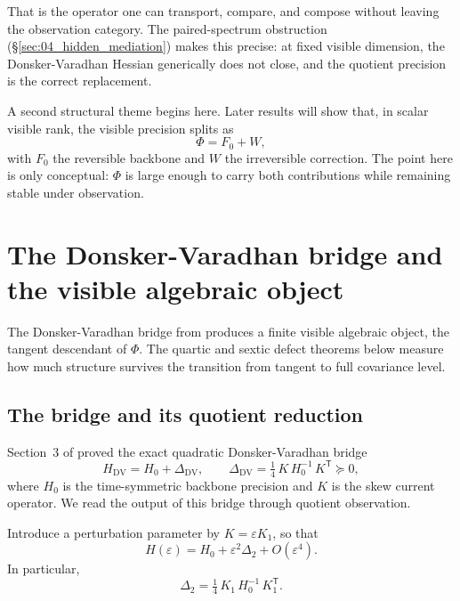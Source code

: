 \documentclass[11pt]{article}
\numberwithin{equation}{section}
\newcommand{\eps}{\varepsilon}
\theoremstyle{thmcompact}
\theoremstyle{remark}
\begin{document}
That is the operator one can transport, compare, and compose without leaving the observation category. The paired-spectrum obstruction (\S\ref{sec:04_hidden_mediation}) makes this precise: at fixed visible dimension, the Donsker-Varadhan Hessian generically does not close, and the quotient precision is the correct replacement.

A second structural theme begins here. Later results will show that, in scalar visible rank, the visible precision splits as
\begin{equation}
\Phi = F_0 + W,
\label{eq:conservation-split-preview}
\end{equation}
with $F_0$ the reversible backbone and $W$ the irreversible correction. The point here is only conceptual: $\Phi$ is large enough to carry both contributions while remaining stable under observation.


\section{The Donsker-Varadhan bridge and the visible algebraic object}
\label{sec:03_dv_bridge}

The Donsker-Varadhan bridge from \cite{Dunkley2026FiniteObservation} produces a finite visible algebraic object, the tangent descendant of $\Phi$. The quartic and sextic defect theorems below measure how much structure survives the transition from tangent to full covariance level.

\subsection{The bridge and its quotient reduction}

Section~3 of \cite{Dunkley2026FiniteObservation} proved the exact quadratic Donsker-Varadhan bridge
\begin{equation}
H_{\mathrm{DV}} = H_0 + \Delta_{\mathrm{DV}},
\qquad
\Delta_{\mathrm{DV}} = \tfrac{1}{4}\, K\, H_0^{-1}\, K^{\mathsf T} \succeq 0,
\label{eq:dv-bridge}
\end{equation}
where $H_0$ is the time-symmetric backbone precision and $K$ is the skew current operator. We read the output of this bridge through quotient observation.

Introduce a perturbation parameter by $K = \eps K_1$, so that
\begin{equation}
H(\eps) = H_0 + \eps^2 \Delta_2 + O(\eps^4).
\label{eq:eps-bookkeeping}
\end{equation}
In particular,
\begin{equation}
\Delta_2 = \tfrac{1}{4}\, K_1\, H_0^{-1}\, K_1^{\mathsf T}.
\label{eq:Delta2-definition}
\end{equation}
\end{document}
